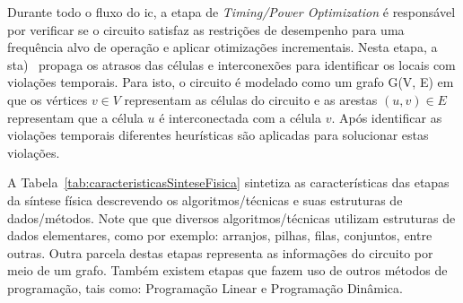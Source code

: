 Durante todo o fluxo do \ac{ic}, a etapa de \textit{Timing/Power Optimization} é responsável por verificar se o circuito satisfaz as restrições de desempenho para uma frequência alvo de operação e aplicar otimizações incrementais.
Nesta etapa, a \ac{sta})~\cite{srivastava2006statistical, chadha2009static} propaga os atrasos das células e interconexões para identificar os locais com violações temporais.
Para isto, o circuito é modelado como um grafo G(V, E) em que os vértices $v \in V$ representam as células do circuito e as arestas $(u, v) \in E$ representam que a célula $u$ é interconectada com a célula $v$. 
Após identificar as violações temporais diferentes heurísticas são aplicadas para solucionar estas violações.


A Tabela~\ref{tab:caracteristicasSinteseFisica} sintetiza as características das etapas da síntese física descrevendo os algoritmos/técnicas e suas estruturas de dados/métodos.
Note que que diversos algoritmos/técnicas utilizam estruturas de dados elementares, como por exemplo: arranjos, pilhas, filas, conjuntos, entre outras.
Outra parcela destas etapas representa as informações do circuito por meio de um grafo.
Também existem etapas que fazem uso de outros métodos de programação, tais como: Programação Linear e Programação Dinâmica.



